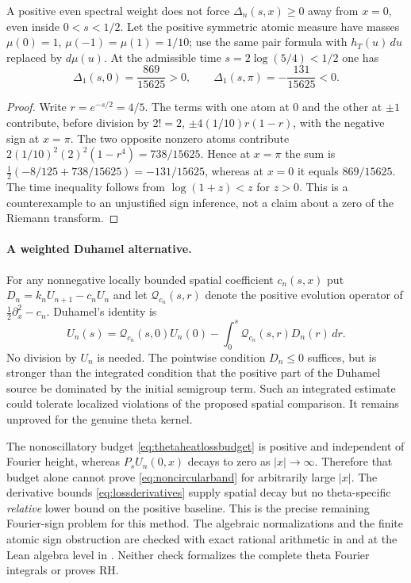 \begin{proposition}
\label{prop:signedlossatom}
A positive even spectral weight does not force
$\Delta_n(s,x)\ge0$ away from $x=0$,
even inside $0<s<1/2$.
Let the positive symmetric atomic measure
have masses $\mu(0)=1$,
$\mu(-1)=\mu(1)=1/10$; use the same
pair formula with $h_T(u)\,du$ replaced
by $d\mu(u)$. At the admissible time
$s=2\log(5/4)<1/2$ one has
\[
\boxed{\Delta_1(s,0)=\frac{869}{15625}>0,
\qquad \Delta_1(s,\pi)=-\frac{131}{15625}<0.}
\]
\end{proposition}
\begin{proof}
Write $r=e^{-s/2}=4/5$. The terms
with one atom at $0$ and the other at
$\pm1$ contribute, before division
by $2!=2$, $\pm4(1/10)r(1-r)$,
with the negative sign at $x=\pi$.
The two opposite nonzero atoms
contribute
$2(1/10)^2(2)^2(1-r^4)=738/15625$.
Hence at $x=\pi$ the sum is
$\frac12(-8/125+738/15625)
=-131/15625$, whereas at $x=0$
it equals $869/15625$.
The time inequality follows from
$\log(1+z)<z$ for $z>0$.
This is a counterexample to an
unjustified sign inference, not a
claim about a zero of the Riemann
transform.
\end{proof}

\paragraph{A weighted Duhamel alternative.}
For any nonnegative locally bounded
spatial coefficient $c_n(s,x)$ put
$D_n=k_nU_{n+1}-c_nU_n$ and let
$\mathcal Q_{c_n}(s,r)$ denote the
positive evolution operator of
$\frac12\partial_x^2-c_n$.
Duhamel's identity is
\begin{equation}
U_n(s)=\mathcal Q_{c_n}(s,0)U_n(0)
-\int_0^s\mathcal Q_{c_n}(s,r)D_n(r)\,dr.
\label{eq:weighteddivisionfree}
\end{equation}
No division by $U_n$ is needed.
The pointwise condition $D_n\le0$
suffices, but is stronger than the
integrated condition that the positive
part of the Duhamel source be dominated
by the initial semigroup term. Such
an integrated estimate could tolerate
localized violations of the proposed
spatial comparison. It remains
unproved for the genuine theta kernel.

The nonoscillatory budget
\eqref{eq:thetaheatlossbudget} is positive
and independent of Fourier height,
whereas $P_sU_n(0,x)$ decays to zero
as $|x|\to\infty$. Therefore that
budget alone cannot prove
\eqref{eq:noncircularband} for
arbitrarily large $|x|$. The derivative
bounds \eqref{eq:lossderivatives}
supply spatial decay but no
theta-specific \emph{relative} lower
bound on the positive baseline.
This is the precise remaining
Fourier-sign problem for this method.
The algebraic normalizations and
the finite atomic sign obstruction are
checked with exact rational arithmetic
in 
and at the Lean algebra level in
.
Neither check formalizes the complete
theta Fourier integrals or proves RH.

